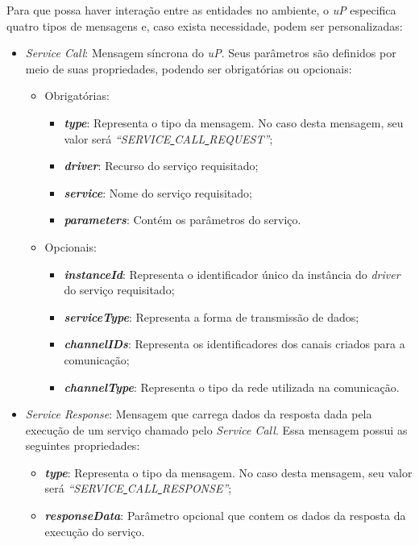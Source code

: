 Para que possa haver interação entre as entidades no ambiente, o \emph{uP} especifica quatro tipos de mensagens e, caso exista necessidade,  podem ser personalizadas:

\begin{itemize}
	\item \emph{Service Call}: Mensagem síncrona do \emph{uP}. Seus parâmetros são definidos por meio de suas propriedades, podendo ser obrigatórias ou opcionais:
		\begin{itemize}
			\item Obrigatórias:
				\begin{itemize}
					\item \emph{\bf{type}}: Representa o tipo da mensagem. No caso desta mensagem, seu valor será \emph{``SERVICE\underline{ }CALL\underline{ }REQUEST''};
					\item \emph{\bf{driver}}: Recurso do serviço requisitado;
					\item \emph{\bf{service}}: Nome do serviço requisitado;
					\item \emph{\bf{parameters}}: Contém os parâmetros do serviço.
				\end{itemize}
			\item Opcionais:
				\begin{itemize}
					\item \emph{\bf{instanceId}}: Representa o identificador único da instância do \emph{driver} do serviço requisitado;
					\item \emph{\bf{serviceType}}: Representa a forma de transmissão de dados;
					\item \emph{\bf{channelIDs}}: Representa os identificadores dos canais criados para a comunicação;
					\item \emph{\bf{channelType}}: Representa o tipo da rede utilizada na comunicação.
				\end{itemize}
		\end{itemize}
	\item \emph{Service Response}: Mensagem que carrega dados da resposta dada pela execução de um serviço chamado pelo \emph{Service Call}. Essa mensagem possui as seguintes propriedades:
		\begin{itemize}
			\item \emph{\bf{type}}: Representa o tipo da mensagem. No caso desta mensagem, seu valor será \emph{``SERVICE\underline{ }CALL\underline{ }RESPONSE''};
			\item \emph{\bf{responseData}}: Parâmetro opcional que contem os dados da resposta da execução do serviço.

\end{itemize}
\end{itemize}
